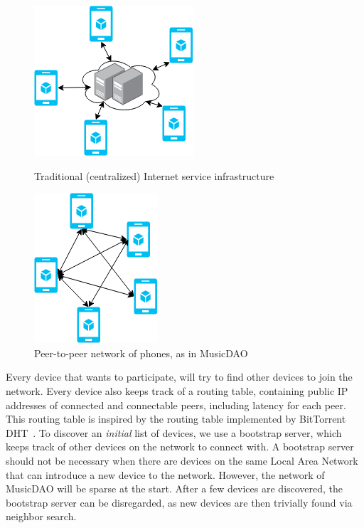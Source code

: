 \begin{figure}
        \centering
        \includegraphics[width=0.6\linewidth]{design/centralized-service.png}
        \caption{Traditional (centralized) Internet service infrastructure}
        \label{fig:centralized-service}
    \endminipage\hfill
        \centering
        \includegraphics[width=0.6\linewidth]{design/decentralized-phones.png}
        \caption{Peer-to-peer network of phones, as in MusicDAO}
        \label{fig:decentralized-phones}
    \endminipage
\end{figure}

Every device that wants to participate, will try to find other devices to join the network. Every device also keeps track of a routing table, containing public IP addresses of connected and connectable peers, including latency for each peer. This routing table is inspired by the routing table implemented by BitTorrent DHT~\citep{bittorrentbep5dht}. To discover an \textit{initial} list of devices, we use a bootstrap server, which keeps track of other devices on the network to connect with. A bootstrap server should not be necessary when there are devices on the same Local Area Network that can introduce a new device to the network. However, the network of MusicDAO will be sparse at the start. After a few devices are discovered, the bootstrap server can be disregarded, as new devices are then trivially found via neighbor search.

